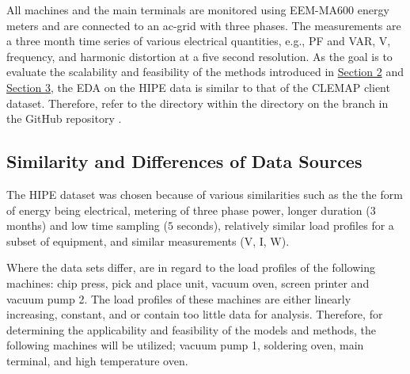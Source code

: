 All machines and the main terminals are monitored using EEM-MA600 energy meters and are connected to an ac-grid with three phases. The measurements are a three month time series of various electrical quantities, e.g., PF and \ac{VAR}, V, frequency, and harmonic distortion at a five second resolution. As the goal is to evaluate the scalability and feasibility of the methods introduced in \hyperlink{section.2}{Section 2} and \hyperlink{section.3}{Section 3}, the EDA on the HIPE data is similar to that of the CLEMAP client dataset. Therefore, refer to the  directory within the  directory on the   branch in the GitHub repository \cite{Stechschulte_Gaussian_Processes_for_2022}. 

\subsection{Similarity and Differences of Data Sources}

The HIPE dataset was chosen because of various similarities such as the the form of energy being electrical, metering of three phase power, longer duration ($3$ months) and low time sampling ($5$ seconds), relatively similar load profiles for a subset of equipment, and similar measurements (V, I, W). 

Where the data sets differ, are in regard to the load profiles of the following machines: chip press, pick and place unit, vacuum oven, screen printer and vacuum pump 2. The load profiles of these machines are either linearly increasing, constant, and or contain too little data for analysis. Therefore, for determining the applicability and feasibility of the models and methods, the following machines will be utilized; vacuum pump 1, soldering oven, main terminal, and high temperature oven.
